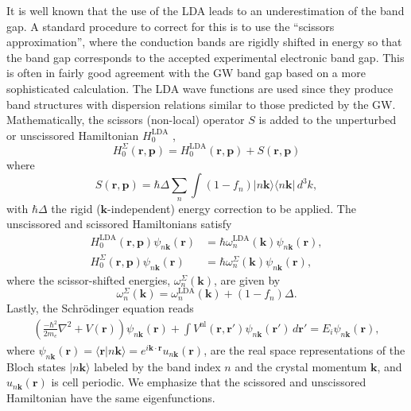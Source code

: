 It is well known that the use of the LDA leads to an underestimation of the band
gap. A standard procedure to correct for this is to use the ``scissors
approximation'', where the conduction bands are rigidly shifted in energy so
that the band gap corresponds to the accepted experimental electronic band
gap.\cite{levinePRL89,levinePRL91,delsolePRB93} This is often in fairly good
agreement with the GW band gap based on a more sophisticated
calculation.\cite{hybertsenPRB86} The LDA wave functions are used since they
produce band structures with dispersion relations similar to those predicted by
the GW. Mathematically, the scissors (non-local) operator $S$ is added to the
unperturbed or unscissored Hamiltonian $H^{\mathrm{LDA}}_{0}$ ,
\begin{equation}\label{ache.1}
H^\Sigma_{0}(\mathbf{r},\mathbf{p})
= H^{\mathrm{LDA}}_{0}(\mathbf{r},\mathbf{p})
+ S(\mathbf{r},\mathbf{p})
\end{equation}
where 
\begin{equation}\label{hats}
S(\mathbf{r},\mathbf{p}) = \hbar \Delta\sum_{n}\int (1-f_{n})
|n\mathbf{k}\rangle\langle n\mathbf{k}|\,d^{3}k,
\end{equation}
with $\hbar\Delta$ the rigid ($\mathbf{k}$-independent) energy correction to be
applied. The unscissored and scissored Hamiltonians satisfy
\begin{align*}
H^{\mathrm{LDA}}_{0}(\mathbf{r},\mathbf{p})\psi _{n\mathbf{k}}(\mathbf{r}) &=
\hbar \omega^{\mathrm{LDA}}_{n}(\mathbf{k})\psi _{n\mathbf{k}}(\mathbf{r}),
\label{hamils} \\
H_{0}^\Sigma (\mathbf{r},\mathbf{p})\psi _{n\mathbf{k}}(\mathbf{r}) &=
\hbar \omega_{n}^\Sigma(\mathbf{k})\psi _{n\mathbf{k}}(\mathbf{r}),
\end{align*}
where the scissor-shifted energies, $\omega_{n}^\Sigma(\mathbf{k})$, are given
by
\begin{equation}\label{chon.78}
\omega_{n}^\Sigma(\mathbf{k})
= \omega^\mathrm{LDA}_{n}(\mathbf{k})+(1-f_{n})\Delta.
\end{equation}
Lastly, the Schr\"odinger equation reads
\begin{align}\label{ache.4} 
\left(
\frac{-\hbar^2}{2m_{e}}\nabla^{2}
+ V(\mathbf{r})
\right)
\psi_{n\mathbf{k}}(\mathbf{r})
+ \int V^{\mathrm{nl}}(\mathbf{r},\mathbf{r}')
  \psi_{n\mathbf{k}}(\mathbf{r}')\,d\mathbf{r}'
= E_{i}\psi_{n\mathbf{k}}(\mathbf{r}),
\end{align} 
where $\psi_{n\mathbf{k}}(\mathbf{r}) = \langle\mathbf{r}|n\mathbf{k}\rangle =
e^{i\mathbf{k}\cdot\mathbf{r}}u_{n\mathbf{k}}(\mathbf{r})$, are the real space
representations of the Bloch states $|n\mathbf{k}\rangle$ labeled by the band
index $n$ and the crystal momentum $\mathbf{k}$, and
$u_{n\mathbf{k}}(\mathbf{r})$ is cell periodic. We emphasize that the scissored
and unscissored Hamiltonian have the same eigenfunctions.


